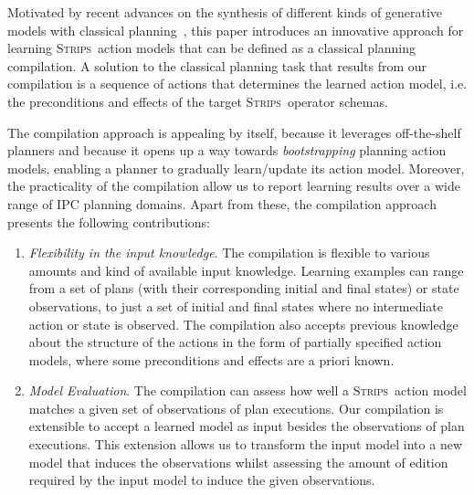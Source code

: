 \documentclass[3p,times]{elsarticle}
\newcommand{\strips}{\textsc{Strips}}     %
\begin{document}
Motivated by recent advances on the synthesis of different kinds of generative models with classical planning~\cite{bonet2009automatic,segovia2016generalized,segovia2016hierarchical,segovia2017generating}, this paper introduces an innovative approach for learning \strips\ action models that can be defined as a classical planning compilation. A solution to the classical planning task that results from our compilation is a sequence of actions that determines the learned action model, i.e. the preconditions and effects of the target \strips\ operator schemas.

The compilation approach is appealing by itself, because it leverages off-the-shelf planners and because it opens up a way towards \emph{bootstrapping} planning action models, enabling a planner to gradually learn/update its action model. Moreover, the practicality of the compilation allow us to report learning results over a wide range of IPC planning domains. Apart from these, the compilation approach presents the following contributions:
\begin{enumerate}
\item {\em Flexibility in the input knowledge}. The compilation is flexible to various amounts and kind of available input knowledge. Learning examples can range from a set of plans (with their corresponding initial and final states) or state observations, to just a set of initial and final states where no intermediate action or state is observed. The compilation also accepts previous knowledge about the structure of the actions in the form of partially specified action models, where some preconditions and effects are a priori known. 

\item {\em Model Evaluation}. The compilation can assess how well a \strips\ action model matches a given set of observations of plan executions. Our compilation is extensible to accept a learned model as input besides the observations of plan executions. This extension allows us to transform the input model into a new model that induces the observations whilst assessing the amount of edition required by the input model to induce the given observations. 
\end{enumerate}
\end{document}
